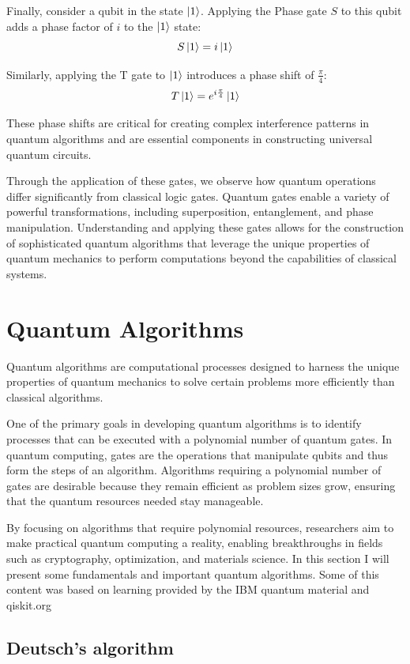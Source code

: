 \documentclass{article}
\begin{document}
	Finally, consider a qubit in the state \( \ket{1} \). Applying the Phase gate \( S \) to this qubit adds a phase factor of \( i \) to the \( \ket{1} \) state:
	\[
	S \ket{1} = i \ket{1}
	\]

	Similarly, applying the T gate to \( \ket{1} \) introduces a phase shift of \( \frac{\pi}{4} \):
	\[
	T \ket{1} = e^{i \frac{\pi}{4}} \ket{1}
	\]

	These phase shifts are critical for creating complex interference patterns in quantum algorithms and are essential components in constructing universal quantum circuits.

	Through the application of these gates, we observe how quantum operations differ significantly from classical logic gates. Quantum gates enable a variety of powerful transformations, including superposition, entanglement, and phase manipulation. Understanding and applying these gates allows for the construction of sophisticated quantum algorithms that leverage the unique properties of quantum mechanics to perform computations beyond the capabilities of classical systems.

\newpage

\section{Quantum Algorithms}

	Quantum algorithms are computational processes designed to harness the unique properties of quantum mechanics to solve certain problems more efficiently than classical algorithms.

	One of the primary goals in developing quantum algorithms is to identify processes that can be executed with a polynomial number of quantum gates. In quantum computing, gates are the operations that manipulate qubits and thus form the steps of an algorithm. Algorithms requiring a polynomial number of gates are desirable because they remain efficient as problem sizes grow, ensuring that the quantum resources needed stay manageable.

	By focusing on algorithms that require polynomial resources, researchers aim to make practical quantum computing a reality, enabling breakthroughs in fields such as cryptography, optimization, and materials science. In this section I will present some fundamentals and important quantum algorithms. Some of this content was based on learning provided by the IBM quantum material and qiskit.org

	\subsection{Deutsch's algorithm}
\end{document}
